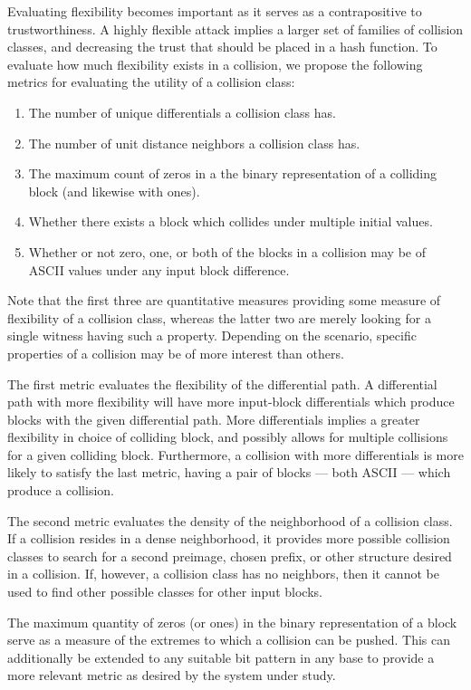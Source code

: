 \documentclass[conference]{IEEEtran}
\begin{document}
Evaluating flexibility becomes important as it serves as a
contrapositive to trustworthiness.  A highly flexible attack implies a
larger set of families of collision classes, and decreasing the trust
that should be placed in a hash function. To evaluate how much flexibility exists in a collision,
we propose the following metrics for evaluating the utility of a collision
class:
\begin{enumerate}
    \item The number of unique differentials a collision class has.
    \item The number of unit distance neighbors a collision class has.
    \item The maximum count of zeros in a the binary representation of a
        colliding block (and likewise with ones).
    \item Whether there exists a block which collides under multiple initial
        values.
    \item Whether or not zero, one, or both of the blocks in a collision may
        be of ASCII values under any input block difference.
\end{enumerate}
Note that the first three are quantitative measures providing some measure of
flexibility of a collision class, whereas the latter two are merely looking
for a single witness having such a property. Depending on the scenario,
specific properties of a collision may be of more interest than others.

The first metric evaluates the flexibility of the differential path. A
differential path with more flexibility will have more input-block differentials which
produce blocks with the given differential path. More differentials implies
a greater flexibility in choice of colliding block, and possibly allows
for multiple collisions for a given colliding block. Furthermore, a collision
with more differentials is more likely to satisfy the last metric, having a
pair of blocks --- both ASCII --- which produce a collision.

The second metric evaluates the density of the neighborhood of a collision
class. If a collision resides in a dense neighborhood, it provides more
possible collision classes to search for a second preimage, chosen prefix, or
other structure desired in a collision. If, however, a collision class has no
neighbors, then it cannot be used to find other possible classes for other
input blocks.

The maximum quantity of zeros (or ones) in the binary representation of a
block serve as a measure of the extremes to which a collision can be pushed.
This can additionally be extended to any suitable bit pattern in any base to
provide a more relevant metric as desired by the system under study.
\end{document}
